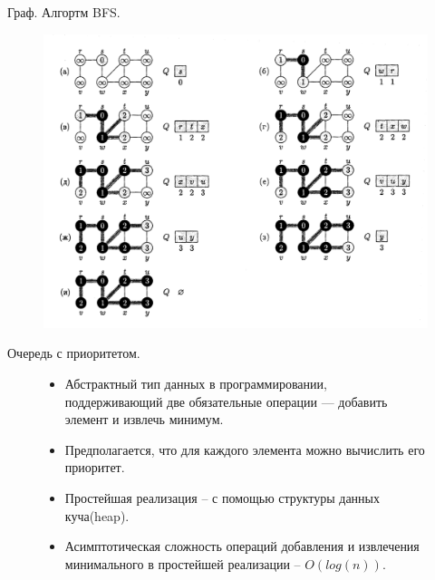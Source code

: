 \documentclass[10pt]{beamer}
\begin{document}
\begin{frame}{Граф. Алгортм BFS.}
\begin{figure}
\centerline{\includegraphics[width=1.0\linewidth]{images/bfs_graph.png}}
\end{figure}
\end{frame}



\begin{frame}{Очередь с приоритетом.}
\begin{figure}
\begin{itemize}
\item Абстрактный тип данных в программировании, поддерживающий две обязательные операции — добавить элемент и извлечь минимум.
\item Предполагается, что для каждого элемента можно вычислить его приоритет.
\item Простейшая реализация -- с помощью структуры данных куча(heap).
\item Асимптотическая сложность операций добавления и извлечения минимального в простейшей реализации -- $O(log(n))$.
\end{itemize}
\end{figure}
\end{frame}
\end{document}
